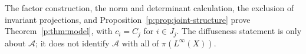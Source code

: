 The factor construction, the norm and determinant calculation, the
exclusion of invariant projections, and
Proposition~\ref{p:prop:joint-structure} prove
Theorem~\ref{p:thm:model}, with $c_i=C_j$ for $i\in J_j$.
The diffuseness statement is only about $\mathcal A$; it does not
identify $\mathcal A$ with all of $\pi(L^\infty(X))$.
